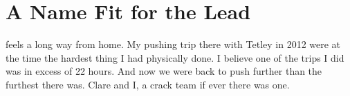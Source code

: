 \begin{marginfigure}
\end{marginfigure}

\section{A Name Fit for the Lead}


 feels a long way from home. My pushing trip there with Tetley in 2012 were at the time the hardest thing I had physically done. I believe one of the trips I did was in excess of 22 hours. And now we were back to push further than the furthest there was. Clare and I, a crack team if ever there was one. 

